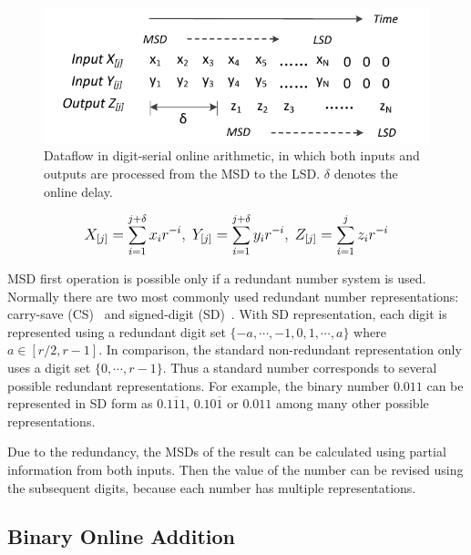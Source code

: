 \documentclass[journal]{IEEEtran}
\begin{document}
\begin{figure}[tbp]
  \centering
  \includegraphics[width=.48\textwidth]{./Figures/OnlineArithmetic_DataFlow.pdf}
  \caption{Dataflow in digit-serial online arithmetic, in which both inputs and outputs are processed from the MSD to the LSD. $\delta$ denotes the online delay.}
  \label{Fig:OnlineDataFlow}
\end{figure}
%
\begin{eqnarray}\label{Eq:Online_Operands}
\footnotesize
  X_{[j]}=\sum_{i=1}^{j+\delta}x_ir^{-i},~Y_{[j]}=\sum_{i=1}^{j+\delta}y_ir^{-i},~Z_{[j]}=\sum_{i=1}^{j}z_ir^{-i}
\normalsize
\end{eqnarray}

MSD first operation is possible only if a redundant number system is used. Normally there are two most commonly used redundant number representations: carry-save (CS)~\cite{CSadder}  and signed-digit (SD)~\cite{RedundantNumber}. With SD representation, each digit is represented using a redundant digit set $\{-a,\cdots,-1,0,1,\cdots,a\}$ where $a\in[r/2,r-1]$. In comparison, the standard non-redundant representation only uses a digit set $\{0,\cdots,r-1\}$. Thus a standard number corresponds to several possible redundant representations. For example, the binary number $0.011$ can be represented in SD form as $0.1\overline{1}1$, $0.10\overline{1}$ or $0.011$ among many other possible representations.

Due to the redundancy, the MSDs of the result can be calculated using partial information from both inputs. Then the value of the number can be revised using the subsequent digits, because each number has multiple representations.

\subsection{Binary Online Addition}\label{subsec:OnlineAdder}
\end{document}
